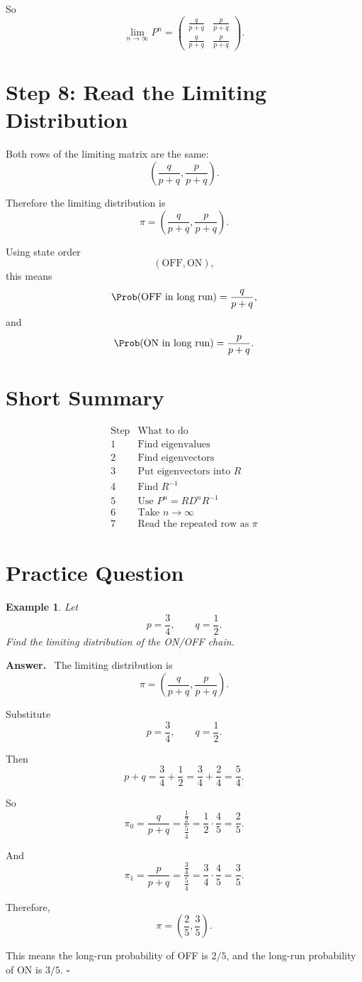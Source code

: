 \documentclass[12pt,a4paper]{article}
\theoremstyle{notestyle}
\newtheorem{example}{Example}
\newenvironment{answer}
{\par\textbf{Answer.}\ }
{\hfill$\square$\par}
\begin{document}
So
\[
\boxed{
\lim_{n\to\infty}P^n
=
\begin{pmatrix}
\frac{q}{p+q} & \frac{p}{p+q}\\
\frac{q}{p+q} & \frac{p}{p+q}
\end{pmatrix}.
}
\]

\section{Step 8: Read the Limiting Distribution}

Both rows of the limiting matrix are the same:
\[
\left(\frac{q}{p+q},\frac{p}{p+q}\right).
\]

Therefore the limiting distribution is
\[
\boxed{
\pi=
\left(\frac{q}{p+q},\frac{p}{p+q}\right).
}
\]

Using state order
\[
(\text{OFF},\text{ON}),
\]
this means
\[
\Prob(\text{OFF in long run})=\frac{q}{p+q},
\]
and
\[
\Prob(\text{ON in long run})=\frac{p}{p+q}.
\]

\section{Short Summary}

\[
\begin{array}{c|c}
\text{Step} & \text{What to do}\\
\hline
1 & \text{Find eigenvalues}\\
2 & \text{Find eigenvectors}\\
3 & \text{Put eigenvectors into }R\\
4 & \text{Find }R^{-1}\\
5 & \text{Use }P^n=RD^nR^{-1}\\
6 & \text{Take }n\to\infty\\
7 & \text{Read the repeated row as }\pi
\end{array}
\]

\section{Practice Question}

\begin{example}
Let
\[
p=\frac34,
\qquad
q=\frac12.
\]
Find the limiting distribution of the ON/OFF chain.
\end{example}

\begin{answer}
The limiting distribution is
\[
\pi=
\left(\frac{q}{p+q},\frac{p}{p+q}\right).
\]

Substitute
\[
p=\frac34,
\qquad
q=\frac12.
\]

Then
\[
p+q=\frac34+\frac12=\frac34+\frac24=\frac54.
\]

So
\[
\pi_0=\frac{q}{p+q}
=
\frac{\frac12}{\frac54}
=
\frac12\cdot\frac45
=
\frac25.
\]

And
\[
\pi_1=\frac{p}{p+q}
=
\frac{\frac34}{\frac54}
=
\frac34\cdot\frac45
=
\frac35.
\]

Therefore,
\[
\boxed{
\pi=\left(\frac25,\frac35\right).
}
\]

This means the long-run probability of OFF is $2/5$, and the long-run probability of ON is $3/5$.
\end{answer}
\end{document}
